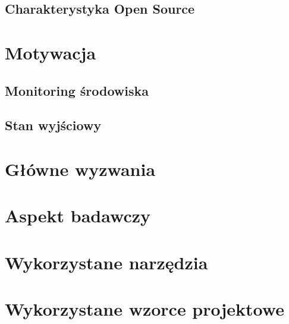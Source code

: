 \subsection{Charakterystyka Open Source}


\section{Motywacja}


\subsection{Monitoring środowiska}

\subsection{Stan wyjściowy}

\section{Główne wyzwania}
\section{Aspekt badawczy}
\section{Wykorzystane narzędzia}
\section{Wykorzystane wzorce projektowe}
